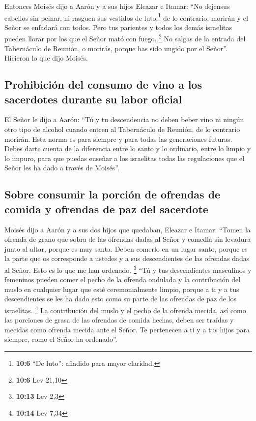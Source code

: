 Entonces Moisés dijo a Aarón y a sus hijos Eleazar e
Itamar: ``No dejensus cabellos sin peinar, ni rasguen sus vestidos de
luto,\footnote{\textbf{10:6} ``De luto'': añadido para mayor claridad.}
de lo contrario, morirán y el Señor se enfadará con todos. Pero tus
parientes y todos los demás israelitas pueden llorar por los que el
Señor mató con fuego. \footnote{\textbf{10:6} Lev 21,10} 
No salgas de la entrada del Tabernáculo de Reunión, o morirás, porque
has sido ungido por el Señor''. Hicieron lo que dijo Moisés.

\hypertarget{prohibiciuxf3n-del-consumo-de-vino-a-los-sacerdotes-durante-su-labor-oficial}{%
\subsection{Prohibición del consumo de vino a los sacerdotes durante su
labor
oficial}\label{prohibiciuxf3n-del-consumo-de-vino-a-los-sacerdotes-durante-su-labor-oficial}}

 El Señor le dijo a Aarón:  ``Tú y tu
descendencia no deben beber vino ni ningún otro tipo de alcohol cuando
entren al Tabernáculo de Reunión, de lo contrario morirán. Esta norma es
para siempre y para todas las generaciones futuras. 
Debes darte cuenta de la diferencia entre lo santo y lo ordinario, entre
lo limpio y lo impuro,  para que puedas enseñar a los
israelitas todas las regulaciones que el Señor les ha dado a través de
Moisés''.

\hypertarget{sobre-consumir-la-porciuxf3n-de-ofrendas-de-comida-y-ofrendas-de-paz-del-sacerdote}{%
\subsection{Sobre consumir la porción de ofrendas de comida y ofrendas
de paz del
sacerdote}\label{sobre-consumir-la-porciuxf3n-de-ofrendas-de-comida-y-ofrendas-de-paz-del-sacerdote}}

 Moisés dijo a Aarón y a sus dos hijos que quedaban,
Eleazar e Itamar: ``Tomen la ofrenda de grano que sobra de las ofrendas
dadas al Señor y comedla sin levadura junto al altar, porque es muy
santa.  Deben comerlo en un lugar santo, porque es la
parte que os corresponde a ustedes y a sus descendientes de las ofrendas
dadas al Señor. Esto es lo que me han ordenado. \footnote{\textbf{10:13}
  Lev 2,3}  ``Tú y tus descendientes masculinos y
femeninos pueden comer el pecho de la ofrenda ondulada y la contribución
del muslo en cualquier lugar que esté ceremonialmente limpio, porque a
ti y a tus descendientes se les ha dado esto como su parte de las
ofrendas de paz de los israelitas. \footnote{\textbf{10:14} Lev 7,34}
 La contribución del muslo y el pecho de la ofrenda
mecida, así como las porciones de grasa de las ofrendas de comida
hechas, deben ser traídas y mecidas como ofrenda mecida ante el Señor.
Te pertenecen a ti y a tus hijos para siempre, como el Señor ha
ordenado''.

